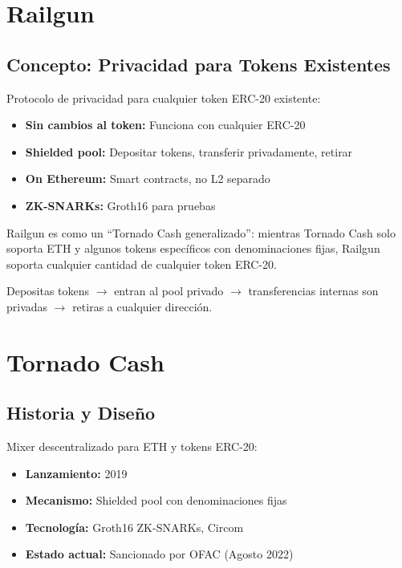 \documentclass[11pt,a4paper,twoside]{book}
\begin{document}
\section{Railgun}
\label{sec:railgun}

\subsection{Concepto: Privacidad para Tokens Existentes}

\begin{definition}[Railgun]
Protocolo de privacidad para cualquier token ERC-20 existente:
\begin{itemize}
    \item \textbf{Sin cambios al token:} Funciona con cualquier ERC-20
    \item \textbf{Shielded pool:} Depositar tokens, transferir privadamente, retirar
    \item \textbf{On Ethereum:} Smart contracts, no L2 separado
    \item \textbf{ZK-SNARKs:} Groth16 para pruebas
\end{itemize}
\end{definition}

\begin{intuicion}
Railgun es como un ``Tornado Cash generalizado'': mientras Tornado Cash solo soporta ETH y algunos tokens espec\'ificos con denominaciones fijas, Railgun soporta cualquier cantidad de cualquier token ERC-20.

Depositas tokens $\to$ entran al pool privado $\to$ transferencias internas son privadas $\to$ retiras a cualquier direcci\'on.
\end{intuicion}

\section{Tornado Cash}
\label{sec:tornado}

\subsection{Historia y Dise\~no}

\begin{definition}
Mixer descentralizado para ETH y tokens ERC-20:
\begin{itemize}
    \item \textbf{Lanzamiento:} 2019
    \item \textbf{Mecanismo:} Shielded pool con denominaciones fijas
    \item \textbf{Tecnolog\'ia:} Groth16 ZK-SNARKs, Circom
    \item \textbf{Estado actual:} Sancionado por OFAC (Agosto 2022)
\end{itemize}
\end{definition}
\end{document}
